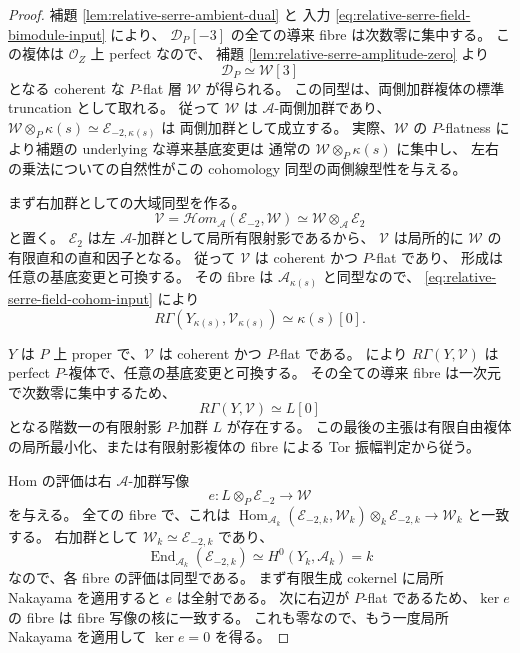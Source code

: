 \begin{proof}
補題 \ref{lem:relative-serre-ambient-dual} と
入力 \eqref{eq:relative-serre-field-bimodule-input} により、
$\mathscr D_P[-3]$ の全ての導来 fibre は次数零に集中する。
この複体は $\mathcal O_Z$ 上 perfect なので、
補題 \ref{lem:relative-serre-amplitude-zero} より
\[
 \mathscr D_P\simeq\mathscr W[3]
\]
となる coherent な $P$-flat 層 $\mathscr W$ が得られる。
この同型は、両側加群複体の標準 truncation として取れる。
従って $\mathscr W$ は $\mathscr A$-両側加群であり、
$\mathscr W\otimes_P\kappa(s)\simeq\mathscr E_{-2,\kappa(s)}$ は
両側加群として成立する。
実際、$\mathscr W$ の $P$-flatness により補題の underlying な導来基底変更は
通常の $\mathscr W\otimes_P\kappa(s)$ に集中し、
左右の乗法についての自然性がこの cohomology 同型の両側線型性を与える。

まず右加群としての大域同型を作る。
\[
 \mathscr V=
 \mathcal Hom_{\mathscr A}(\mathscr E_{-2},\mathscr W)
 \simeq\mathscr W\otimes_{\mathscr A}\mathscr E_2
\]
と置く。
$\mathscr E_2$ は左 $\mathscr A$-加群として局所有限射影であるから、
$\mathscr V$ は局所的に $\mathscr W$ の有限直和の直和因子となる。
従って $\mathscr V$ は coherent かつ $P$-flat であり、
形成は任意の基底変更と可換する。
その fibre は $\mathscr A_{\kappa(s)}$ と同型なので、
\eqref{eq:relative-serre-field-cohom-input} により
\[
 R\Gamma(Y_{\kappa(s)},\mathscr V_{\kappa(s)})\simeq\kappa(s)[0].
\]

$Y$ は $P$ 上 proper で、$\mathscr V$ は coherent かつ $P$-flat である。
\cite[Lemma~30.22.1, Tag~\texttt{07VK}]{StacksRelativeDuality}により
$R\Gamma(Y,\mathscr V)$ は perfect $P$-複体で、任意の基底変更と可換する。
その全ての導来 fibre は一次元で次数零に集中するため、
\[
 R\Gamma(Y,\mathscr V)\simeq L[0]
\]
となる階数一の有限射影 $P$-加群 $L$ が存在する。
この最後の主張は有限自由複体の局所最小化、または有限射影複体の fibre による
Tor 振幅判定から従う。

Hom の評価は右 $\mathscr A$-加群写像
\begin{equation}\label{eq:relative-serre-line-evaluation}
 e:L\otimes_P\mathscr E_{-2}\longrightarrow\mathscr W
\end{equation}
を与える。
全ての fibre で、これは
$\operatorname{Hom}_{\mathscr A_k}(\mathscr E_{-2,k},\mathscr W_k)
 \otimes_k\mathscr E_{-2,k}\to\mathscr W_k$
と一致する。
右加群として $\mathscr W_k\simeq\mathscr E_{-2,k}$ であり、
\[
 \operatorname{End}_{\mathscr A_k}(\mathscr E_{-2,k})
 \simeq H^0(Y_k,\mathscr A_k)=k
\]
なので、各 fibre の評価は同型である。
まず有限生成 cokernel に局所 Nakayama を適用すると $e$ は全射である。
次に右辺が $P$-flat であるため、$\ker e$ の fibre は fibre 写像の核に一致する。
これも零なので、もう一度局所 Nakayama を適用して $\ker e=0$ を得る。


\end{proof}
